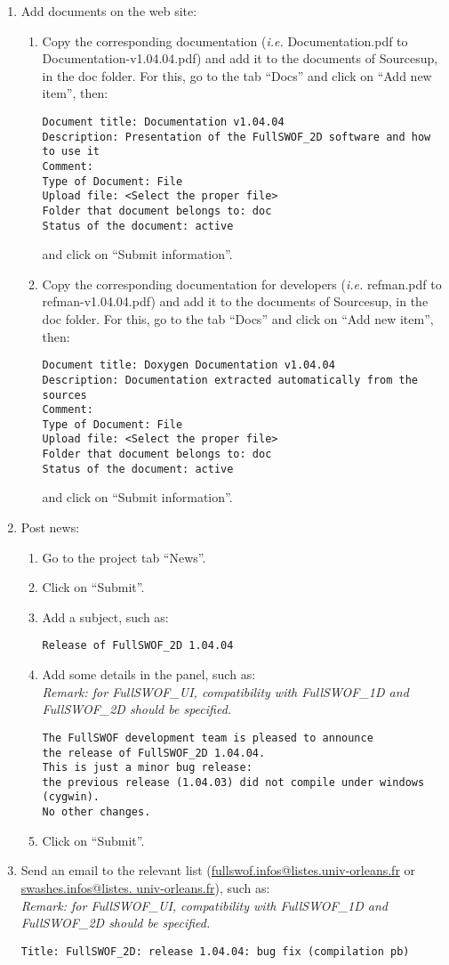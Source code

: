 \documentclass[a4paper, 11pt]{article}
\newcommand{\FullSWOFoneD}{\emph{FullSWOF\_1D}}
\newcommand{\FullSWOFtwoD}{\emph{FullSWOF\_2D}}
\newcommand{\FullSWOFUI}{\emph{FullSWOF\_UI}}
\begin{document}
\begin{enumerate}
\item Add documents on the web site:
\begin{enumerate}
\item Copy the corresponding documentation (\emph{i.e.} Documentation.pdf to Documentation-v1.04.04.pdf) and add it to the documents of Sourcesup, in the doc folder. For this, go to the tab ``Docs'' and click on ``Add new item'', then:
\begin{verbatim}
Document title: Documentation v1.04.04 
Description: Presentation of the FullSWOF_2D software and how to use it
Comment:
Type of Document: File
Upload file: <Select the proper file>
Folder that document belongs to: doc
Status of the document: active
\end{verbatim}
and click on ``Submit information''.
\item Copy the corresponding documentation for developers (\emph{i.e.} refman.pdf to refman-v1.04.04.pdf) and add it to the documents of Sourcesup, in the doc folder. For this, go to the tab ``Docs'' and click on ``Add new item'', then:
\begin{verbatim}
Document title: Doxygen Documentation v1.04.04 
Description: Documentation extracted automatically from the sources
Comment:
Type of Document: File
Upload file: <Select the proper file>
Folder that document belongs to: doc
Status of the document: active
\end{verbatim}
and click on ``Submit information''.
\end{enumerate}
\item Post news:
\begin{enumerate}
\item Go to the project tab ``News''.
\item Click on ``Submit''.
\item Add a subject, such as:
\begin{verbatim}
Release of FullSWOF_2D 1.04.04 
\end{verbatim}
\item Add some details in the panel, such as:\\
\emph{Remark: for \FullSWOFUI, compatibility with \FullSWOFoneD{} and \FullSWOFtwoD{} should be specified.}
\begin{verbatim}
The FullSWOF development team is pleased to announce
the release of FullSWOF_2D 1.04.04.
This is just a minor bug release:
the previous release (1.04.03) did not compile under windows (cygwin).
No other changes.
\end{verbatim}
\item Click on ``Submit''.
\end{enumerate}
\item Send an email to the relevant list (\href{mailto:fullswof.infos@listes.univ-orleans.fr}{fullswof.infos@listes.univ-orleans.fr}
or
\href{mailto:swashes.infos@listes.univ-orleans.fr}{swashes.infos@listes. univ-orleans.fr}), such as:\\
\emph{Remark: for \FullSWOFUI, compatibility with \FullSWOFoneD{} and \FullSWOFtwoD{} should be specified.}
\begin{verbatim}
Title: FullSWOF_2D: release 1.04.04: bug fix (compilation pb)


\end{verbatim}
\end{enumerate}
\end{document}
